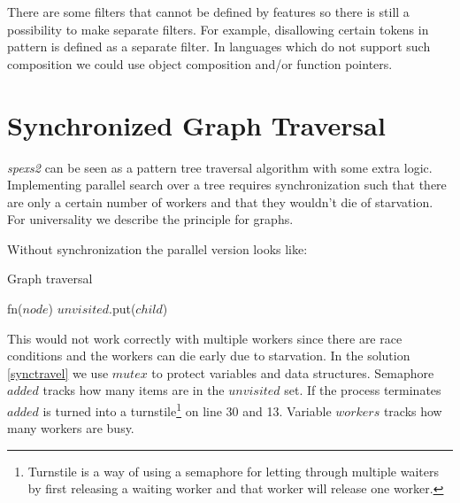 There are some filters that cannot be defined by features so there is still a possibility to make separate filters. For example, disallowing certain tokens in pattern is defined as a separate filter. In languages which do not support such composition we could use object composition and/or function pointers.

\section{Synchronized Graph Traversal}

\emph{spexs2} can be seen as a pattern tree traversal algorithm with some extra logic. Implementing parallel search over a tree requires synchronization such that there are only a certain number of workers and that they wouldn't die of starvation. For universality we describe the principle for graphs.

Without synchronization the parallel version looks like:

\begin{algorithm}[H]
    \caption{Graph traversal}
\begin{algorithmic}[1]

        
        \Spawn
                \State fn($node$)
                        \State $unvisited$.put($child$)
                    \EndIf
                \EndFor
            \EndWhile
        \EndSpawn

    \EndFunction
\end{algorithmic}
\end{algorithm}

This would not work correctly with multiple workers since there are race conditions and the workers can die early due to starvation. In the solution \ref{synctravel} we use $mutex$ to protect variables and data structures. Semaphore $added$ tracks how many items are in the $unvisited$ set. If the process terminates $added$ is turned into a turnstile\footnote{Turnstile\cite{semaphores} is a way of using a semaphore for letting through multiple waiters by first releasing a waiting worker and that worker will release one worker.} on line 30 and 13. Variable $workers$ tracks how many workers are busy.

